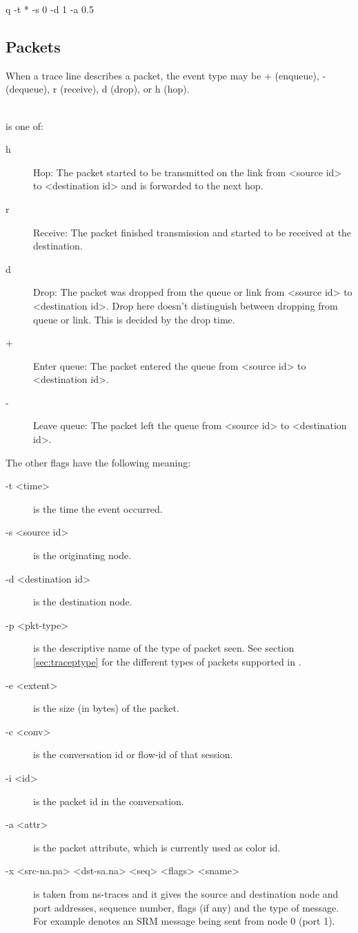 \begin{program}
q -t * -s 0 -d 1 -a 0.5
\end{program}


\subsection{Packets}

When a trace line describes a packet, the event type may be
 + (enqueue), - (dequeue), r (receive), d (drop), 
or h (hop). 

\\

 is one of:
\begin{description}
\item[h] Hop: The packet started to be transmitted on the link from
<source id> to <destination id> and is forwarded to the next hop.

\item[r] Receive: The packet finished transmission and started to be
received at the destination.

\item[d] Drop: The packet was dropped from the queue or link from <source id> 
to <destination id>. Drop here doesn't distinguish between dropping from queue or
link. This is decided by the drop time.  

\item[+] Enter queue: The packet entered the queue from <source id> to
<destination id>.

\item[-] Leave queue: The packet left the queue from <source id> to
<destination id>.  
\end{description}

The other flags have the following meaning:
\begin{description}
\item[-t <time>] is the time the event occurred.
\item[-s <source id>] is the originating node.
\item[-d <destination id>] is the destination node.
\item[-p <pkt-type>] is the descriptive name of the type of packet seen.
See section \ref{sec:traceptype} for the different types of packets 
supported in \ns.
\item[-e <extent>] is the size (in bytes) of the packet.
\item[-c <conv>] is the conversation id or flow-id of that session.
\item[-i <id>] is the packet id in the conversation.
\item[-a <attr>] is the packet attribute, which is currently used as color
id. 
\item[-x <src-na.pa> <dst-sa.na> <seq> <flags> <sname>] is taken from
ns-traces and it gives the source and destination node and port
addresses, sequence number, flags (if any) and the type of message.
For example  denotes an
SRM message being sent from node 0 (port 1).
\end{description}

